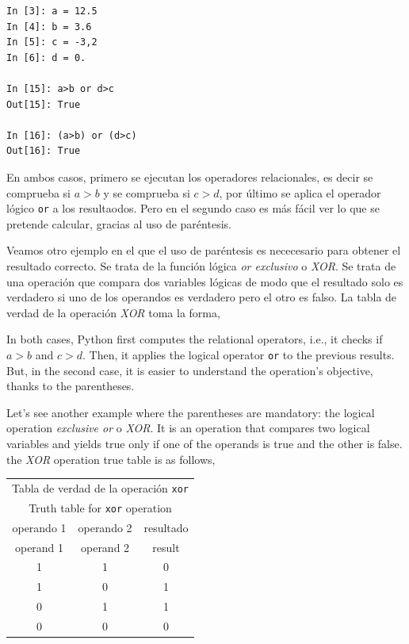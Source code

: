 \begin{center}
    \begin{minipage}{.2\textwidth}
\begin{verbatim}
In [3]: a = 12.5
In [4]: b = 3.6
In [5]: c = -3,2
In [6]: d = 0.

In [15]: a>b or d>c
Out[15]: True

In [16]: (a>b) or (d>c)
Out[16]: True
\end{verbatim}
\end{minipage}
\end{center}

\begin{paracol}{2}
En ambos casos, primero se ejecutan los operadores relacionales, es decir se comprueba si $a>b$ y se comprueba si $c>d$, por último se aplica el operador lógico \texttt{or} a los resultaodos. Pero en el segundo caso es más fácil ver lo que se pretende calcular, gracias al uso de paréntesis.

Veamos otro ejemplo en el que el uso de paréntesis es nececesario para obtener el resultado correcto. Se trata de la función lógica \emph{or exclusivo} o \emph{XOR}. Se trata de una operación que compara dos variables lógicas de modo que el resultado solo es verdadero si uno de los operandos es verdadero pero el otro es falso. La tabla de verdad de la operación \emph{XOR} toma la forma,

\switchcolumn
In both cases, Python first computes the relational operators, i.e., it checks if $a>b$ and $c>d$. Then, it applies the logical operator \texttt{or} to the previous results. But, in the second case, it is easier to understand the operation's objective, thanks to the parentheses.

Let's see another example where the parentheses are mandatory: the logical operation \emph{exclusive or} o \emph{XOR}. It is an operation that compares two logical variables and yields true only if one of the operands is true and the other is false. the \emph{XOR} operation true table is as follows, 
\end{paracol}
\begin{table}[h]
\centering
\begin{tabular}{c|c|c}
\multicolumn{3}{c}{Tabla de verdad de la operación \texttt{xor}}\\
\multicolumn{3}{c}{Truth table for \texttt{xor} operation}\\
\hline
\hline
operando 1&operando 2 &resultado\\
operand 1 & operand 2 & result\\
\hline
1&1&0\\
1&0&1\\
0&1&1\\
0&0&0\\ 
\hline
\hline
\end{tabular}
\end{table}
